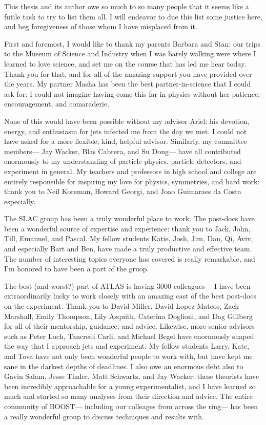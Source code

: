 
This thesis and its author owe so much to so many people that it seems like a futile task to try to list them all. I will endeavor to due this list some justice here, and beg foregiveness of those whom I have misplaced from it.

First and foremost, I would like to thank my parents Barbara and Stan: our trips to the Museum of Science and Industry when I was barely walking were where I learned to love science, and set me on the course that has led me hear today. Thank you for that, and for all of the amazing support you have provided over the years. My partner Masha has been the best partner-in-science that I could ask for: I could not imagine having come this far in physics without her patience, encouragement, and comaraderie. 

None of this would have been possible without my advisor Ariel: his devotion, energy, and enthusiasm for jets infected me from the day we met. I could not have asked for a more flexible, kind, helpful advisor. Similarly, my committee members--- Jay Wacker, Blas Cabrera, and Su Dong--- have all contributed enormously to my understanding of particle physics, particle detectors, and experiment in general. My teachers and professors in high school and college are entirely responsible for inspiring my love for physics, symmetries, and hard work: thank you to Neil Koreman, Howard Georgi, and Joao Guimaraes da Costa especially. 

The SLAC group has been a truly wonderful place to work. The post-docs have been a wonderful source of expertise and experience: thank you to Jack, John, Till, Emanuel, and Pascal. My fellow students Katie, Josh, Jim, Dan, Qi, Aviv, and especially Bart and Ben, have made a truly productive and effective team. The number of interesting topics everyone has covered is really remarkable, and I'm honored to have been a part of the gruop.

The best (and worst?) part of ATLAS is having 3000 colleagues--- I have been extraordinarily lucky to work closely with an amazing cast of the best post-docs on the experiment. Thank you to David Miller, David Lopez Mateos, Zach Marshall, Emily Thompson, Lily Asquith, Caterina Doglioni, and Dag Gillberg for all of their mentorship, guidance, and advice. Likewise, more senior advisors such as Peter Loch, Tancredi Carli, and Michael Begel have enormously shaped the way that I approach jets and experiment. My fellow students Larry, Kate, and Tova have not only been wonderful people to work with, but have kept me sane in the darkest depths of deadlines. I also owe an enormous debt also to Gavin Salam, Jesse Thaler, Matt Schwartz, and Jay Wacker: these theorists have been incredibly approachable for a young experimentalist, and I have learned so much and started so many analyses from their direction and advice. The entire community of BOOST--- including our colleages from across the ring--- has been a really wonderful group to discuss techniques and results with.

